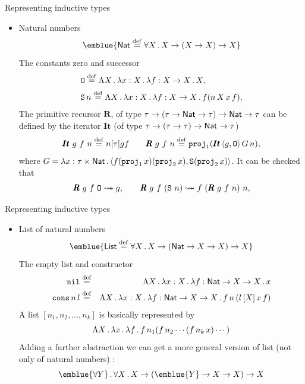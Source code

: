 \documentclass[paper=screen,mode=present,style=zysimple]{powerdot}
\begin{document}
\begin{slide}{Representing inductive types}
\begin{itemize}
\item Natural numbers
\[
\emblue{\tnat \defeq \forall X \ldot X \to (X \to X) \to X}
\]
The constants zero and successor
\[
\begin{array}{l}
\mathtt{O} \stackrel{\mathrm{def}}{=} \Lambda X \, . \, \lambda x : X \, . \, \lambda f : X \to X \, . \, X , 
\\[0.5em]
\mathtt{S} \, n \stackrel{\mathrm{def}}{=} \Lambda X \, . \, \lambda x : X \, . \, \lambda f : X \to X \, . \, f (n \, X \, x \, f), 
\end{array}
\]
The primitive recursor $\pmb{R}$, of type $\tau \to (\tau \to \mathsf{Nat} \to \tau) \to \mathsf{Nat} \to \tau$ 
can be defined by the iterator $\pmb{It}$ (of type $\tau \to (\tau \to \tau) \to \mathsf{Nat} \to \tau$)
\[
\pmb{It} \ g \ f \ n \stackrel{\mathrm{def}}{=} n [\tau] g f 
\qquad
\pmb{R} \ g \ f \ n \stackrel{\mathrm{def}}{=} \mathtt{proj}_1 (\pmb{It} \, \langle{g, \mathtt{O}}\rangle \, G \, n) ,
\]
where $G = \lambda x : \tau \times \mathsf{Nat} \, . \, \langle{f (\mathtt{proj}_1\, x) (\mathtt{proj}_2 \, x), \mathtt{S}(\mathtt{proj}_2 \, x)}\rangle$.
It can be checked that 
\[
\pmb{R} \ g \ f \ \czero \reduceto g , 
\qquad
\pmb{R} \ g \ f \ (\csucc \ n) \reduceto f \ (\pmb{R} \ g \  f  \ n) \ n, 
\]
\end{itemize}
\end{slide}

\begin{slide}{Representing inductive types}
\begin{itemize}
\item List of natural numbers
\[
\emblue{\tlist \defeq \forall X \ldot X \to (\tnat \to X \to X) \to X}
\]
The empty list and constructor
\begin{eqnarray*}
\mathtt{nil} & \stackrel{\mathrm{def}}{=} & \Lambda X \, . \, \lambda x : X \, . \, \lambda f : \mathsf{Nat} \to X \to X \, . \, x
\\
\mathtt{cons} \, n \, l & \stackrel{\mathrm{def}}{=} & \Lambda X \, . \, 
\lambda x : X \, . \, \lambda f : \mathsf{Nat} \to X \to X \, . \, f \, n \, (l \, [X] \, x \, f)
\end{eqnarray*}
A list $[n_1, n_2, \ldots , n_k]$ is basically represented by 
\[
\Lambda X \, . \, \lambda x \, . \, \lambda f \, . \, f \, n_1 ( f \, n_2  \cdots (f \, n_k \, x) \cdots )
\]
Adding a further abstraction we can get a more general version of list (not only of natural numbers) :
\[
\emblue{\forall Y} \ldot \forall X \ldot X \to (\emblue{Y} \to X \to X) \to X 
\]
\end{itemize}
\end{slide}
\end{document}

